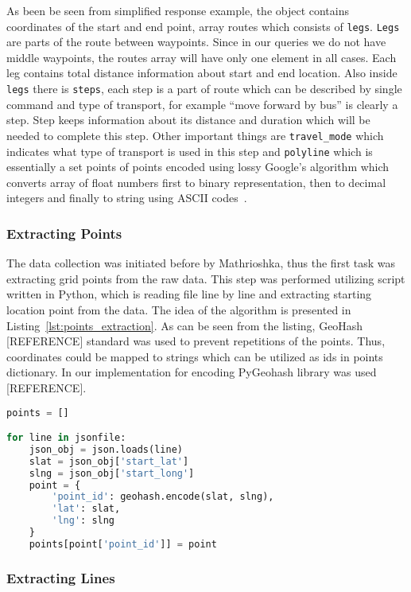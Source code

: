 As been be seen from simplified response example, the object contains coordinates of the
start and end point, array routes which consists of \texttt{legs}. \texttt{Legs} are parts of the
route between waypoints. Since in our queries we do not have middle waypoints, the routes array will have
only one element in all cases. Each leg contains total distance information about start and end
location. Also inside \texttt{legs} there is \texttt{steps}, each step is a part of route
which can be described by single command and type of transport, for example ``move forward by bus''
is clearly a step. Step keeps information about its distance and duration which will be needed
to complete this step. Other important things are \texttt{travel\_mode} which indicates what
type of transport is used in this step and \texttt{polyline} which is essentially a set points
of points encoded using lossy Google's algorithm which converts array of float numbers first
to binary representation, then to decimal integers and finally to string using ASCII
codes~\cite{google:polyline}.

\subsubsection{ Extracting Points }

The data collection was initiated before by Mathrioshka, thus the first task was extracting
grid points from the raw data. This step was performed utilizing script written in Python, which
is reading file line by line and extracting starting location point from the data. The
idea of the algorithm is presented in Listing~\ref{lst:points_extraction}. As can be seen from
the listing, GeoHash [REFERENCE] standard was used to prevent repetitions of the points.
Thus, coordinates could be mapped to strings which can be utilized as ids in points dictionary.
In our implementation for encoding PyGeohash library was used [REFERENCE].

\begin{lstlisting}[language=python, caption=Points extraction, label={lst:points_extraction}]
points = []

for line in jsonfile:
    json_obj = json.loads(line)
    slat = json_obj['start_lat']
    slng = json_obj['start_long']
    point = {
        'point_id': geohash.encode(slat, slng),
        'lat': slat,
        'lng': slng
    }
    points[point['point_id']] = point
\end{lstlisting}

\subsubsection{ Extracting Lines }

